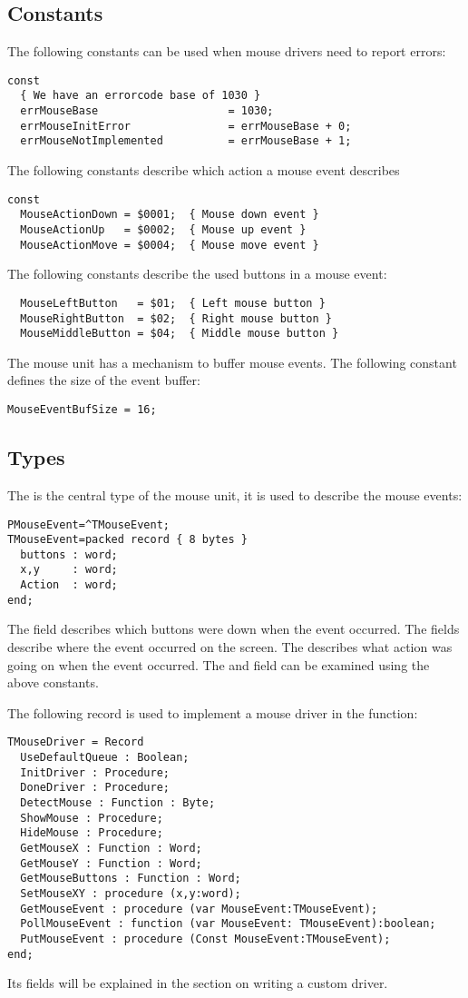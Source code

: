 \subsection{Constants}	
The following constants can be used when mouse drivers need to report 
errors:
\begin{verbatim}
const
  { We have an errorcode base of 1030 }
  errMouseBase                    = 1030;
  errMouseInitError               = errMouseBase + 0;
  errMouseNotImplemented          = errMouseBase + 1;
\end{verbatim}
The following constants describe which action a mouse event describes
\begin{verbatim}
const
  MouseActionDown = $0001;  { Mouse down event }
  MouseActionUp   = $0002;  { Mouse up event }
  MouseActionMove = $0004;  { Mouse move event }
\end{verbatim}
The following constants describe the used buttons in a mouse event:
\begin{verbatim}
  MouseLeftButton   = $01;  { Left mouse button }
  MouseRightButton  = $02;  { Right mouse button }
  MouseMiddleButton = $04;  { Middle mouse button }
\end{verbatim}
The mouse unit has a mechanism to buffer mouse events. The following
constant defines the size of the event buffer:
\begin{verbatim}
MouseEventBufSize = 16;
\end{verbatim}
\subsection{Types}
The  is the central type of the mouse unit, it is used
to describe the mouse events:
\begin{verbatim}
PMouseEvent=^TMouseEvent;
TMouseEvent=packed record { 8 bytes }
  buttons : word;
  x,y     : word;
  Action  : word;
end;
\end{verbatim}
The  field describes which buttons were down when the event
occurred. The  fields describe where the event occurred on the
screen. The  describes what action was going on when the event
occurred. The  and  field can be examined using the
above constants.

The following record is used to implement a mouse driver in the
 function:
\begin{verbatim}
TMouseDriver = Record 
  UseDefaultQueue : Boolean;
  InitDriver : Procedure;
  DoneDriver : Procedure;
  DetectMouse : Function : Byte;
  ShowMouse : Procedure;
  HideMouse : Procedure;
  GetMouseX : Function : Word;
  GetMouseY : Function : Word;
  GetMouseButtons : Function : Word;
  SetMouseXY : procedure (x,y:word);
  GetMouseEvent : procedure (var MouseEvent:TMouseEvent);
  PollMouseEvent : function (var MouseEvent: TMouseEvent):boolean;
  PutMouseEvent : procedure (Const MouseEvent:TMouseEvent); 
end;
\end{verbatim}
Its fields will be explained in the section on writing a custom driver.

